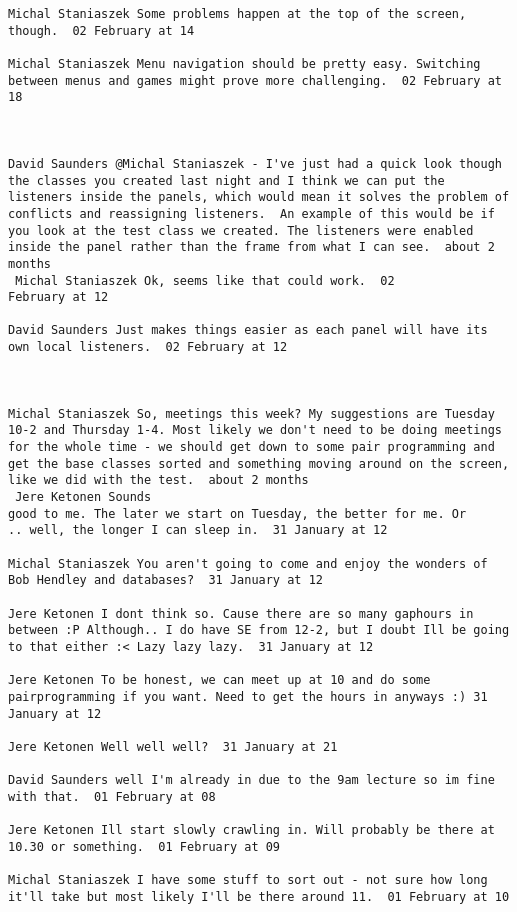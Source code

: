 \begin{verbatim}
Michal Staniaszek Some problems happen at the top of the screen,
though.  02 February at 14

Michal Staniaszek Menu navigation should be pretty easy. Switching
between menus and games might prove more challenging.  02 February at
18



David Saunders @Michal Staniaszek - I've just had a quick look though
the classes you created last night and I think we can put the
listeners inside the panels, which would mean it solves the problem of
conflicts and reassigning listeners.  An example of this would be if
you look at the test class we created. The listeners were enabled
inside the panel rather than the frame from what I can see.  about 2
months 
 Michal Staniaszek Ok, seems like that could work.  02
February at 12

David Saunders Just makes things easier as each panel will have its
own local listeners.  02 February at 12



Michal Staniaszek So, meetings this week? My suggestions are Tuesday
10-2 and Thursday 1-4. Most likely we don't need to be doing meetings
for the whole time - we should get down to some pair programming and
get the base classes sorted and something moving around on the screen,
like we did with the test.  about 2 months 
 Jere Ketonen Sounds
good to me. The later we start on Tuesday, the better for me. Or
.. well, the longer I can sleep in.  31 January at 12

Michal Staniaszek You aren't going to come and enjoy the wonders of
Bob Hendley and databases?  31 January at 12

Jere Ketonen I dont think so. Cause there are so many gaphours in
between :P Although.. I do have SE from 12-2, but I doubt Ill be going
to that either :< Lazy lazy lazy.  31 January at 12

Jere Ketonen To be honest, we can meet up at 10 and do some
pairprogramming if you want. Need to get the hours in anyways :) 31
January at 12

Jere Ketonen Well well well?  31 January at 21

David Saunders well I'm already in due to the 9am lecture so im fine
with that.  01 February at 08

Jere Ketonen Ill start slowly crawling in. Will probably be there at
10.30 or something.  01 February at 09

Michal Staniaszek I have some stuff to sort out - not sure how long
it'll take but most likely I'll be there around 11.  01 February at 10


\end{verbatim}
